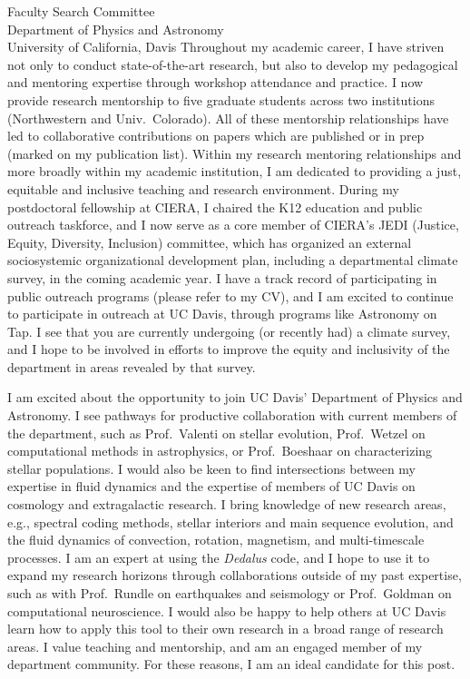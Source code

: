 \documentclass[12pt]{letter}
\begin{document}
\begin{letter}{
               Faculty Search Committee \\
               Department of Physics and Astronomy \\
               University of California, Davis 
           }
    Throughout my academic career, I have striven not only to conduct state-of-the-art research, but also to develop my pedagogical and mentoring expertise through workshop attendance and practice.
    I now provide research mentorship to five graduate students across two institutions (Northwestern and Univ.~Colorado).
    All of these mentorship relationships have led to collaborative contributions on papers which are published or in prep (marked on my publication list).
    Within my research mentoring relationships and more broadly within my academic institution, I am dedicated to providing a just, equitable and inclusive teaching and research environment.
    During my postdoctoral fellowship at CIERA, I chaired the K12 education and public outreach taskforce, and I now serve as a core member of CIERA's JEDI (Justice, Equity, Diversity, Inclusion) committee, which has organized an external sociosystemic organizational development plan, including a departmental climate survey, in the coming academic year.
    I have a track record of participating in public outreach programs (please refer to my CV), and I am excited to continue to participate in outreach at UC Davis, through programs like Astronomy on Tap.
    I see that you are currently undergoing (or recently had) a climate survey, and I hope to be involved in efforts to improve the equity and inclusivity of the department in areas revealed by that survey.


    I am excited about the opportunity to join UC Davis' Department of Physics and Astronomy.
    I see pathways for productive collaboration with current members of the department, such as Prof.~Valenti on stellar evolution, Prof.~Wetzel on computational methods in astrophysics, or Prof.~Boeshaar on characterizing stellar populations.
    I would also be keen to find intersections between my expertise in fluid dynamics and the expertise of members of UC Davis on cosmology and extragalactic research.
    I bring knowledge of new research areas, e.g., spectral coding methods, stellar interiors and main sequence evolution, and the fluid dynamics of convection, rotation, magnetism, and multi-timescale processes.
    I am an expert at using the \emph{Dedalus} code, and I hope to use it to expand my research horizons through collaborations outside of my past expertise, such as with Prof.~Rundle on earthquakes and seismology or Prof.~Goldman on computational neuroscience.
    I would also be happy to help others at UC Davis learn how to apply this tool to their own research in a broad range of research areas.
    I value teaching and mentorship, and am an engaged member of my department community.
    For these reasons, I am an ideal candidate for this post.


\end{letter}
\end{document}

